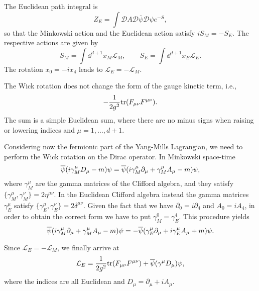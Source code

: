 The Euclidean path integral is
\begin{equation}
    Z_E = \int \mathcal{D} A \mathcal{D} \overline{\psi} \mathcal{D} \psi e^{-S},
\end{equation}
so that the Minkowski action and the Euclidean action satisfy $i S_M = - S_E$.
The respective actions are given by
\begin{equation}
    S_M = \int \dd^{d+1} x_M \mathcal{L}_M, \qquad
    S_E = \int \dd^{d+1} x_E \mathcal{L}_E.
\end{equation}
The rotation $x_0 = -i x_4$ leads to $\mathcal{L}_E = - \mathcal{L}_M$.

The Wick rotation does not change the form of the gauge kinetic term, i.e.,
\begin{equation}
    - \frac{1}{2 g^2} \text{tr}(F_{\mu \nu} F^{\mu \nu}).
\end{equation}
The sum is a simple Euclidean sum, where there are no minus signs when raising or lowering indices and $\mu = 1, \dots, d+1$.

Considering now the fermionic part of the Yang-Mills Lagrangian, we need to perform the Wick rotation on the Dirac operator.
In Minkowski space-time
\begin{equation}
    \overline{\psi} \qty( i \gamma^{\mu}_M D_{\mu} - m ) \psi
    = \overline{\psi} \qty( i \gamma^{\mu}_M \partial_{\mu} + \gamma^{\mu}_M A_{\mu} - m ) \psi,
\end{equation}
where $\gamma^{\mu}_M$ are the gamma matrices of the Clifford algebra, and they satisfy $\{\gamma^{\mu}_M, \gamma^{\nu}_M\} = 2 \eta^{\mu \nu}$.
In the Euclidean Clifford algebra instead the gamma matrices $\gamma^{\mu}_E$ satisfy $\{\gamma^{\mu}_E, \gamma^{\nu}_E\} = 2 \delta^{\mu \nu}$.
Given the fact that we have $\partial_0 = i \partial_4$ and $A_0 = i A_4$, in order to obtain the correct form we have to put $\gamma^0_M = \gamma^4_E$.
This procedure yields
\begin{equation}
    \overline{\psi} \qty( i \gamma^{\mu}_M \partial_{\mu} + \gamma^{\mu}_M A_{\mu} - m ) \psi
    =
    - \overline{\psi} \qty( \gamma^{\mu}_E \partial_{\mu} + i\gamma^{\mu}_E A_{\mu} + m ) \psi.
\end{equation}

Since $\mathcal{L}_E = - \mathcal{L}_M$, we finally arrive at
\begin{equation}
    \mathcal{L}_E
    = \frac{1}{2 g^2} \text{tr} (F_{\mu \nu} F^{\mu \nu}) + \overline{\psi} \qty( \gamma^{\mu} D_{\mu} ) \psi,
\end{equation}
where the indices are all Euclidean and $D_{\mu} = \partial_{\mu} + i A_{\mu}$.




